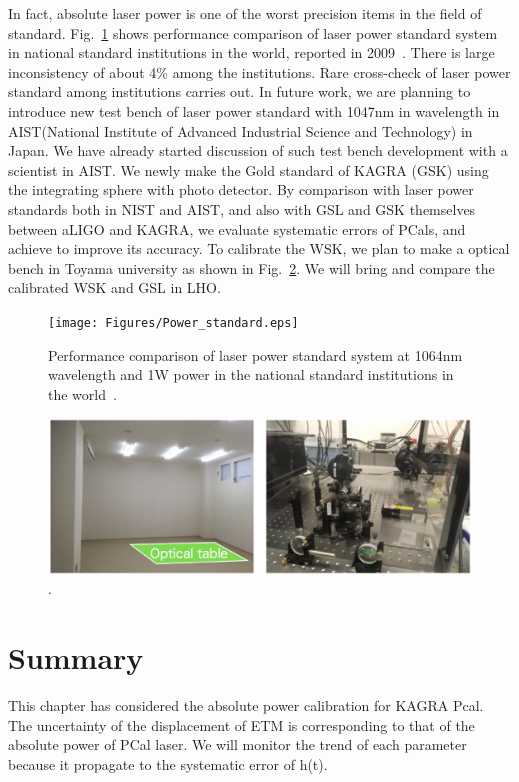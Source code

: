 In fact, absolute laser power is one of the worst precision items in the field of standard. Fig.~\ref{fig:Power_standard} shows performance comparison of laser power standard system in national standard institutions in the world, reported in 2009~\cite{EUROMET}. There is large inconsistency of about 4\% among the institutions. Rare cross-check of laser power standard among institutions carries out. In future work, we are planning to introduce new test bench of laser power standard with 1047nm in wavelength in AIST(National Institute of Advanced Industrial Science and Technology)  in Japan. We have already started discussion of such test bench development with a scientist in AIST. We newly make the Gold standard of KAGRA (GSK) using the integrating sphere with photo detector. By comparison with laser power standards both in NIST and AIST, and also with GSL and GSK themselves between aLIGO and KAGRA, we evaluate systematic errors of PCals, and achieve to improve its accuracy. To calibrate the WSK, we plan to make a optical bench in Toyama university as shown in Fig.~\ref{fig:Toyama}. We will bring and compare the calibrated WSK and GSL in LHO.

\begin{figure}
\begin{center}
\texttt{[image: Figures/Power\_standard.eps]}
\caption{
Performance comparison of laser power standard system at 1064nm wavelength and 1W power in the national standard institutions in the world~\cite{EUROMET}.
} 
\label{fig:Power_standard} 
\end{center}
\end{figure}

\begin{figure}
\begin{center}
\includegraphics[width=14cm]{Figures/Toyama.eps}
\caption{.} 
\label{fig:Toyama} 
\end{center}
\end{figure}

\section{Summary}
This chapter has considered the absolute power calibration for KAGRA Pcal. The uncertainty of the displacement of ETM is corresponding to that of the absolute power of PCal laser. We will monitor the trend of each parameter because it propagate to the systematic error of h(t). 






